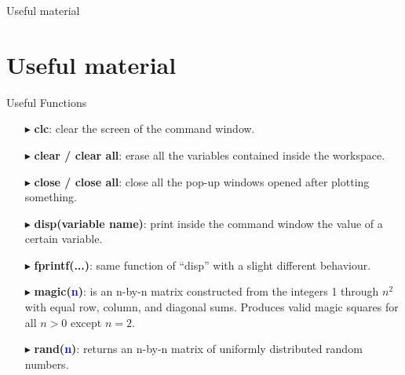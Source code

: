 \documentclass[xcolor={dvipsnames,rgb}, aspectratio=169]{beamer}
\begin{document}
{%
\begin{frame}[standout]
    Useful material
\end{frame}
}

\section{Useful material}
\begin{frame}{Useful Functions}
    \begin{itemize}
        \item[$\blacktriangleright$] \textbf{clc}: clear the screen of the command window.
        \item[$\blacktriangleright$] \textbf{clear / clear all}: erase all the variables
              contained inside the workspace.
        \item[$\blacktriangleright$] \textbf{close / close all}: close all the pop-up windows
              opened after plotting something.
        \item[$\blacktriangleright$] \textbf{disp(variable name)}: print inside the command
              window the value of a certain variable.
        \item[$\blacktriangleright$] \textbf{fprintf(...)}: same function of ``disp'' with a
              slight different behaviour.
        \item[$\blacktriangleright$] \textbf{magic(\textcolor{blue}{n})}: is an n-by-n matrix
              constructed from the integers 1 through $n^2$ with equal row, column, and diagonal
              sums. Produces valid magic squares for all $n > 0$ except $n = 2$.
        \item[$\blacktriangleright$] \textbf{rand(\textcolor{blue}{n})}: returns an n-by-n
              matrix of uniformly distributed random numbers.
    \end{itemize}
\end{frame}
\end{document}
